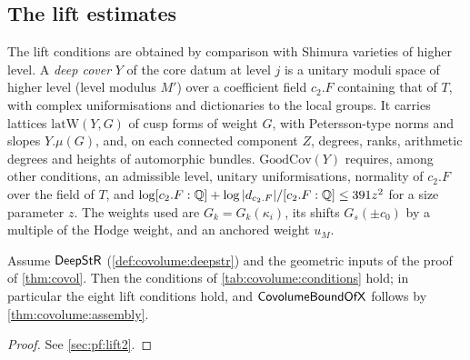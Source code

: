 \subsection{The lift estimates}\label{sec:covolume:lift}

The lift conditions are obtained by comparison with Shimura varieties of higher level. A \emph{deep
cover} $Y$ of the core datum at level $j$ is a unitary moduli space of higher level (level modulus $M'$)
over a coefficient field $c_2.F$ containing that of $T$, with complex uniformisations and dictionaries
to the local groups. It carries lattices $\mathrm{latW}(Y,G)$ of cusp forms of weight $G$, with
Petersson-type norms and slopes $Y.\mu(G)$, and, on each connected component $Z$, degrees, ranks,
arithmetic degrees and heights of automorphic bundles. $\mathrm{GoodCov}(Y)$ requires, among other
conditions, an admissible level, unitary uniformisations, normality of $c_2.F$ over the field of $T$, and
$\log[c_2.F:\mathbb{Q}]+\log|d_{c_2.F}|/[c_2.F:\mathbb{Q}]\le391z^2$ for a size parameter $z$. The weights used are
$G_k=G_k(\kappa_i)$, its shifts $G_s(\pm c_0)$ by a multiple of the Hodge weight, and an anchored weight
$u_M$.

\begin{theorem}\Fmark\label{thm:covolume:lift}
Assume $\mathsf{DeepStR}$ (\cref{def:covolume:deepstr}) and the geometric inputs of the proof of
\cref{thm:covol}. Then the conditions of \cref{tab:covolume:conditions} hold; in particular the eight
lift conditions hold, and $\mathsf{CovolumeBoundOfX}$ follows by \cref{thm:covolume:assembly}.
\end{theorem}
\begin{proof}See \cref{sec:pf:lift2}.
\end{proof}


